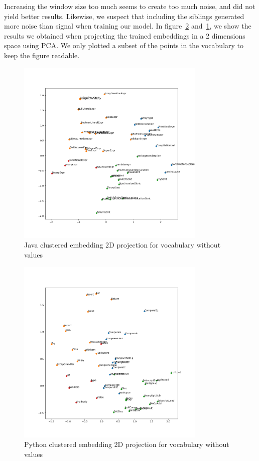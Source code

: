 Increasing the window size too much seems to create too much noise, and did not
yield better results. Likewise, we suspect that including the siblings generated
more noise than signal when training our model. In
figure~\ref{fig:python-embeddings} and~\ref{fig:java-embeddings}, we show the
results we obtained when projecting the trained embeddings in a 2 dimensions
space using PCA\cite{DBLP:journals/corr/Shlens14}. We only plotted a subset of
the points in the vocabulary to keep the figure readable.

\begin{figure}
  \centering\includegraphics[height=9cm]{images/java-embeddings.png}
  \caption{\label{fig:java-embeddings}Java clustered embedding 2D projection for vocabulary without
  values}
\end{figure}

\begin{figure}
  \centering\includegraphics[height=9cm]{images/python-embeddings.png}
  \caption{\label{fig:python-embeddings}Python clustered embedding 2D projection for vocabulary without
  values}
\end{figure}

